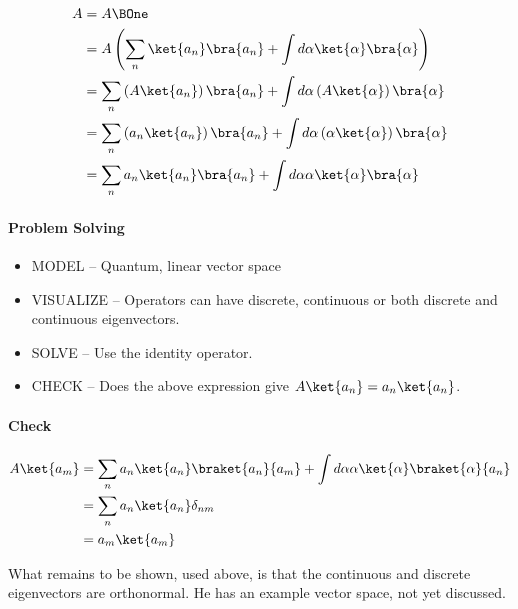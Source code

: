 \begin{equation}\label{eqn:lecture8makingSenseOfQM:1060}
\begin{aligned}
A &= A \BOne \\
&= A \left( \sum_n \ket{a_n} \bra{a_n} + \int d\alpha \ket{\alpha} \bra{\alpha} \right) \\
&= \sum_n \left(A \ket{a_n} \right)\bra{a_n} + \int d\alpha \left(A \ket{\alpha} \right)\bra{\alpha} \\
&= \sum_n \left(a_n \ket{a_n}\right) \bra{a_n} + \int d\alpha \left(\alpha \ket{\alpha}\right) \bra{\alpha} \\
&= \sum_n a_n \ket{a_n} \bra{a_n} + \int d\alpha \alpha \ket{\alpha} \bra{\alpha}
\end{aligned}
\end{equation}

\paragraph{Problem Solving}

\begin{itemize}
\item MODEL -- Quantum, linear vector space
\item VISUALIZE -- Operators can have discrete, continuous or both discrete and continuous eigenvectors.
\item SOLVE -- Use the identity operator.
\item CHECK -- Does the above expression give $A \ket{a_n} = a_n \ket{a_n}$.
\end{itemize}

\paragraph{Check}

\begin{equation}\label{eqn:lecture8makingSenseOfQM:1080}
\begin{aligned}
A \ket{a_m}
&= \sum_n a_n \ket{a_n} \braket{a_n}{a_m} + \int d\alpha \alpha \ket{\alpha} \braket{\alpha}{a_n} \\
&= \sum_n a_n \ket{a_n} \delta_{nm} \\
&= a_m \ket{a_m}
\end{aligned}
\end{equation}

What remains to be shown, used above, is that the continuous and discrete eigenvectors are orthonormal.  He has an example vector space, not yet discussed.

